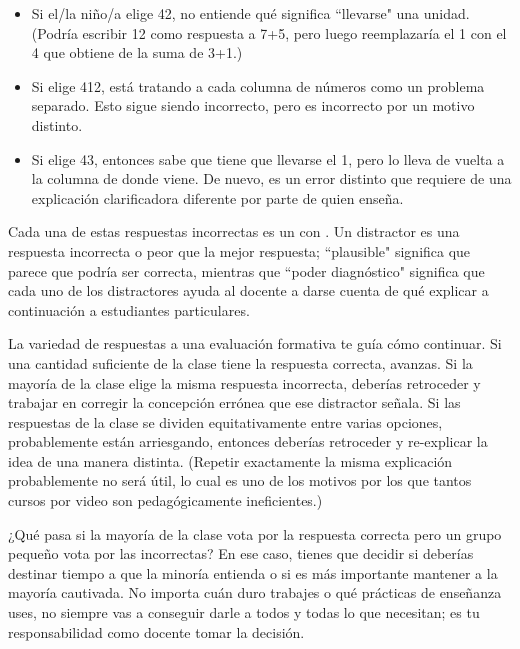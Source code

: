 \begin{itemize}

\item
  Si el/la niño/a elige 42,
no entiende qué significa ``llevarse" una unidad.
(Podría escribir 12 como respuesta a 7+5,
pero luego reemplazaría el 1 con el 4 que obtiene de la suma de 3+1.)
\item
 Si elige 412,
está tratando a cada columna de números como un problema separado.
Esto sigue siendo incorrecto,
pero es incorrecto por un motivo distinto.

\item
Si elige 43, entonces sabe que tiene que llevarse el 1,
pero lo lleva de vuelta a la columna de donde viene.
De nuevo,
es un error distinto
que requiere de una explicación clarificadora diferente por parte de quien enseña.  
\end{itemize}

Cada una de estas respuestas incorrectas es un 
con .
Un distractor es una respuesta incorrecta o peor que la mejor respuesta;
``plausible" significa que parece que podría ser correcta,
mientras que ``poder diagnóstico" significa que cada uno de los distractores ayuda al docente a darse cuenta de qué explicar a continuación a estudiantes particulares.

La variedad de respuestas a una evaluación formativa te guía cómo continuar.
Si una cantidad suficiente de la clase tiene la respuesta correcta, avanzas.
Si la mayoría de la clase elige la misma respuesta incorrecta,
deberías retroceder y trabajar en corregir la concepción errónea que ese distractor señala.
Si las respuestas de la clase se dividen equitativamente entre varias opciones, probablemente están arriesgando, entonces deberías retroceder y re-explicar la idea de una manera distinta.
(Repetir exactamente la misma explicación probablemente no será útil,
lo cual es uno de los motivos por los que tantos cursos por video son pedagógicamente ineficientes.)

¿Qué pasa si la mayoría de la clase vota por la respuesta correcta
pero un grupo pequeño vota por las incorrectas?
En ese caso, 
tienes que decidir si deberías destinar tiempo a que la minoría entienda
o si es más importante mantener a la mayoría cautivada.
No importa cuán duro trabajes o qué prácticas de enseñanza uses,
no siempre vas a conseguir darle a todos y todas lo que necesitan;
es tu responsabilidad como docente tomar la decisión.

